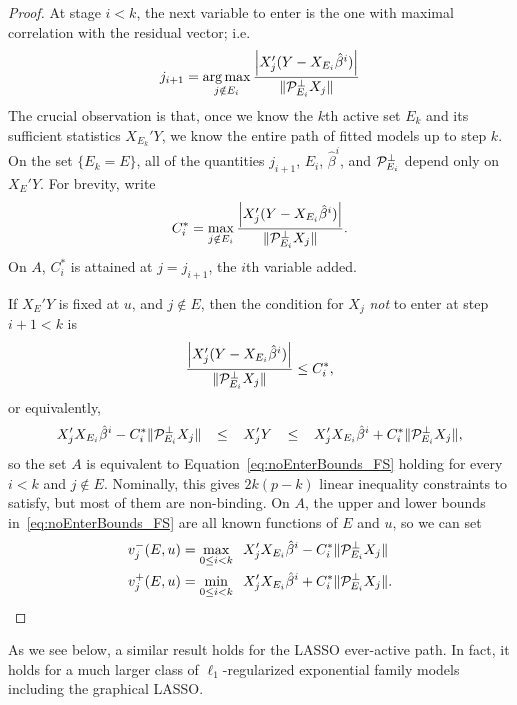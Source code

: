 \documentclass{article}
\begin{document}
\begin{proof}
  At stage $i < k$, the next variable to enter is the one with maximal correlation with the residual vector; i.e.
  \[
  j_{i+1} = \operatorname*{arg\,max}_{j \notin E_i} 
  \frac{\left| X_j ' (Y - X_{E_i}\hat\beta^i) \right|}
  {\|\mathcal{P}_{E_i}^\perp X_j\|}
  \]
  The crucial observation is that, 
  once we know the $k$th active set 
  $E_k$ and its sufficient statistics
  $X_{E_k}'Y$, we know the entire 
  path of fitted models up to step $k$.
  On the set $\{E_k=E\}$, all of the quantities 
  $j_{i+1}$, $E_i$, $\hat\beta^i$, and $\mathcal{P}_{E_i}^\perp$
  depend only on $X_E'Y$. For brevity, write
  \[
  C_i^* = \max_{j \notin E_i} 
  \frac{\left| X_j ' (Y - X_{E_i}\hat\beta^i) \right|}
  {\|\mathcal{P}_{E_i}^\perp X_j\|}.
  \]
  On $A$, $C_i^*$ is attained at $j=j_{i+1}$, the $i$th 
  variable added.

  If $X_E'Y$ is fixed at $u$, and $j \notin E$, then the condition for 
  $X_j$ {\em not} to enter at step $i+1 < k$ is
  \[
  \frac{\left| X_j' (Y - X_{E_i}\hat\beta^i) \right|}
  {\|\mathcal{P}_{E_i}^\perp X_j\|} 
  \leq C_i^*,
  \]
  or equivalently,
  \begin{equation}\label{eq:noEnterBounds_FS}
    X_j' X_{E_i}\hat\beta^i -
    C_i^*\|\mathcal{P}_{E_{i}}^\perp X_{j}\|
    \;\;\;\leq\;\;\;
    X_j'Y
    \;\;\;\leq\;\;\;
    X_j' X_{E_i}\hat\beta^i +
    C_i^*\|\mathcal{P}_{E_{i}}^\perp X_{j}\|, 
  \end{equation}
  so the set $A$ is equivalent to 
  Equation~\eqref{eq:noEnterBounds_FS} holding
  for every $i < k$ and $j \notin E$. Nominally, this gives $2k(p-k)$
  linear inequality constraints to satisfy, but most of them are
  non-binding. On $A$, the upper and lower bounds
  in~\eqref{eq:noEnterBounds_FS}
  are all known functions of $E$ and $u$, so we can set
  \begin{align}\label{eq:vMinus_FS}
    v_j^-(E,u) &= \max_{0 \leq i < k} \;\;X_j' X_{E_i}\hat\beta^i -
    C_i^*\|\mathcal{P}_{E_{i}}^\perp X_{j}\| \\
    \label{eq:vPlus_FS}
    v_j^+(E,u) &= \min_{0 \leq i < k} \;\;X_j' X_{E_i}\hat\beta^i +
    C_i^*\|\mathcal{P}_{E_{i}}^\perp X_{j}\|.
  \end{align}  
\end{proof}

As we see below, a similar result holds for the LASSO ever-active path. In fact, it holds for a much larger class of $\ell_1$-regularized exponential family models including the graphical LASSO.
\end{document}

